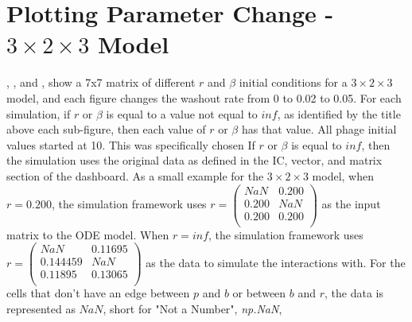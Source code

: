 \section{Plotting Parameter Change - $3\times 2\times 3$ Model}
, , and , show a 7x7 matrix of different $r$ and $\beta$ initial conditions for a $3\times2\times3$ model, and each figure changes the washout rate from 0 to 0.02 to 0.05. 
For each simulation, if $r$ or $\beta$ is equal to a value not equal to $inf$, as identified by the title above each sub-figure, then each value of $r$ or $\beta$ has that value.
All phage initial values started at 10. This was specifically chosen 
If $r$ or $\beta$ is equal to $inf$, then the simulation uses the original data as defined in the IC, vector, and matrix section of the dashboard. 
As a small example for the $3\times 2\times 3$ model, when $r=0.200$, the simulation framework uses $r = \left(\begin{smallmatrix} NaN & 0.200 \\ 0.200 & NaN \\ 0.200 & 0.200 \\ \end{smallmatrix}\right)$ as the input matrix to the ODE model. 
When $r=inf$, the simulation framework uses $r=\left(\begin{smallmatrix} NaN & 0.11695 \\ 0.144459 & NaN \\ 0.11895 & 0.13065 \\ \end{smallmatrix}\right)$ as the data to simulate the interactions with. 
For the cells that don't have an edge between $p$ and $b$ or between $b$ and $r$, the data is represented as $NaN$, short for "Not a Number", \textit{np.NaN}, 

